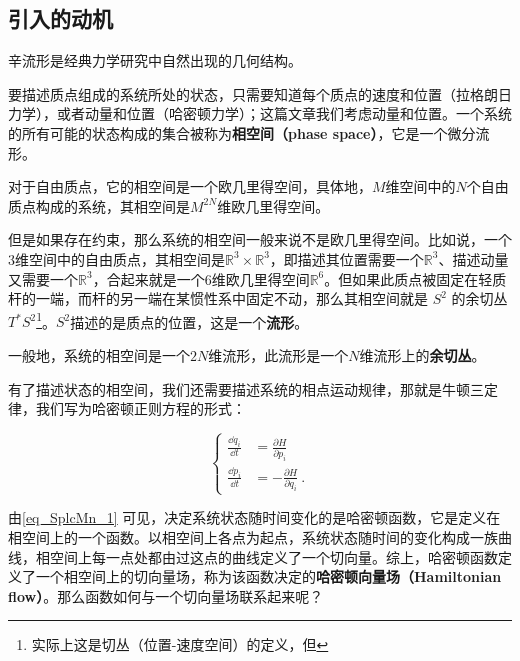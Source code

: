 

\subsection{引入的动机}

辛流形是经典力学研究中自然出现的几何结构。

要描述质点组成的系统所处的状态，只需要知道每个质点的速度和位置（拉格朗日力学），或者动量和位置（哈密顿力学）；这篇文章我们考虑动量和位置。一个系统的所有可能的状态构成的集合被称为\textbf{相空间（phase space）}，它是一个微分流形。

对于自由质点，它的相空间是一个欧几里得空间，具体地，$M$维空间中的$N$个自由质点构成的系统，其相空间是$M^{2 N}$维欧几里得空间。

但是如果存在约束，那么系统的相空间一般来说不是欧几里得空间。比如说，一个$3$维空间中的自由质点，其相空间是$\mathbb{R}^3\times \mathbb{R}^3$，即描述其位置需要一个$\mathbb{R}^3$、描述动量又需要一个$\mathbb{R}^3$，合起来就是一个$6$维欧几里得空间$\mathbb{R}^6$。但如果此质点被固定在轻质杆的一端，而杆的另一端在某惯性系中固定不动，那么其相空间就是 $S^2$ 的余切丛$T^* S^2$\footnote{实际上这是切丛（位置-速度空间）的定义，但}。$S^2$描述的是质点的位置，这是一个\textbf{流形}。


一般地，系统的相空间是一个$2N$维流形，此流形是一个$N$维流形上的\textbf{余切丛}。

有了描述状态的相空间，我们还需要描述系统的相点运动规律，那就是牛顿三定律，我们写为哈密顿正则方程的形式：

\begin{equation}\label{eq_SplcMn_1}
\left\{
\begin{aligned}
\frac{\dd q_i}{\dd t} &= \frac{\partial H}{\partial p_i}\\
\frac{\dd p_i}{\dd t} &= -\frac{\partial H}{\partial q_i}~.
\end{aligned}
\right. 
\end{equation}

由\autoref{eq_SplcMn_1} 可见，决定系统状态随时间变化的是哈密顿函数，它是定义在相空间上的一个函数。以相空间上各点为起点，系统状态随时间的变化构成一族曲线，相空间上每一点处都由过这点的曲线定义了一个切向量。综上，哈密顿函数定义了一个相空间上的切向量场，称为该函数决定的\textbf{哈密顿向量场（Hamiltonian flow）}。那么函数如何与一个切向量场联系起来呢？

